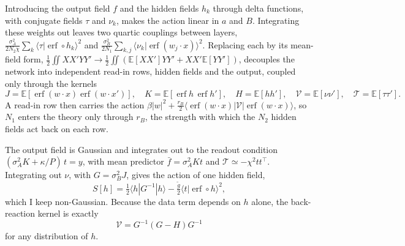 \documentclass[11pt,a4paper]{article}
\newcommand{\E}{\mathbb{E}}
\newcommand{\erf}{\operatorname{erf}}
\begin{document}
Introducing the output field $f$ and the hidden fields $h_k$ through delta functions, with conjugate fields $\tau$ and
$\nu_k$, makes the action linear in $a$ and $B$. Integrating these weights out leaves two quartic couplings between
layers, $\frac{\sigma_A^2}{2N_2\chi}\sum_k\langle\tau|\erf\circ h_k\rangle^2$ and
$\frac{\sigma_B^2}{2N_1}\sum_{k,j}\langle\nu_k|\erf(w_j\cdot x)\rangle^2$. Replacing each by its mean-field form,
$\tfrac12\iint XX'YY'\to\tfrac12\iint(\E[XX']YY'+XX'\E[YY'])$, decouples the network into independent read-in rows, hidden
fields and the output, coupled only through the kernels
\begin{equation}
  J=\E[\erf(w\cdot x)\erf(w\cdot x')],\quad K=\E[\erf h\,\erf h'],\quad H=\E[hh'],\quad \mathcal V=\E[\nu\nu'],\quad \mathcal T=\E[\tau\tau'] .
\end{equation}
A read-in row then carries the action $\beta|w|^2+\frac{r_B}{2}\langle\erf(w\cdot x)|\mathcal V|\erf(w\cdot x)\rangle$, so
$N_1$ enters the theory only through $r_B$, the strength with which the $N_2$ hidden fields act back on each row.

The output field is Gaussian and integrates out to the readout condition $(\sigma_A^2K+\kappa/P)\,t=y$, with mean predictor
$\bar f=\sigma_A^2Kt$ and $\mathcal T\simeq-\chi^2tt^\top$. Integrating out $\nu$, with $G=\sigma_B^2J$, gives the action
of one hidden field,
\begin{equation}
  S[h]=\tfrac12\langle h|G^{-1}|h\rangle-\tfrac{\tilde g}{2}\langle t|\erf\circ h\rangle^2 ,
\end{equation}
which I keep non-Gaussian. Because the data term depends on $h$ alone, the back-reaction kernel is exactly
\begin{equation}
  \mathcal V=G^{-1}(G-H)G^{-1}
\end{equation}
for any distribution of $h$.
\end{document}
